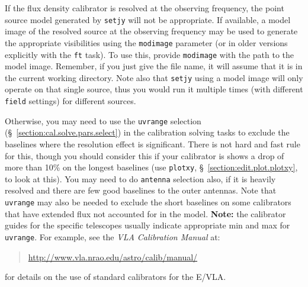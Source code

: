 If the flux density calibrator is resolved at the observing frequency,
the point source model generated by {\tt setjy} will not be
appropriate.  If available, a model image of the resolved source at
the observing frequency may be used to generate the appropriate
visibilities using the {\tt modimage} parameter (or in older
versions explicitly with the {\tt ft} task).  To use this, provide
{\tt modimage} with the path to the model image.  Remember, if you
just give the file name, it will assume that it is in the
current working directory.  Note also that {\tt setjy} using a 
model image will only operate on that single source, thus you
would run it multiple times (with different {\tt field} settings)
for different sources.

Otherwise, you may
need to use the {\tt uvrange} selection
(\S~\ref{section:cal.solve.pars.select}) 
in the calibration solving tasks to exclude the baselines
where the resolution effect is significant.  There is not hard
and fast rule for this, though you should consider this if your
calibrator is shows a drop of more than 10\% on the longest baselines
(use {\tt plotxy}, \S~\ref{section:edit.plot.plotxy}, to look at this).
You may need to do {\tt antenna} selection also, if it is heavily
resolved and there are few good baselines to the outer antennas.
Note that {\tt uvrange} may also be needed to exclude the short
baselines on some calibrators that have extended flux not accounted
for in the model.
{\bf Note:} the calibrator guides for the specific telescopes usually
indicate appropriate min and max for {\tt uvrange}. For example,
see the {\em VLA Calibration Manual} at:
\begin{quote}
   \url{http://www.vla.nrao.edu/astro/calib/manual/}
\end{quote}
for details on the use of standard calibrators for the E/VLA.

